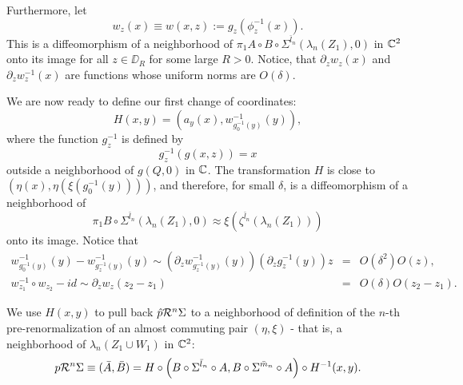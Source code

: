 Furthermore, let
$$w_z(x)\equiv w(x,z) := g_{z}\left(\phi_{z}^{-1}( x) \right).$$
This is a diffeomorphism of a neighborhood of   $\pi_1 A \circ B \circ \Sigma^{\bar l_n}(\lambda_n (Z_1),0)$ in ${\Bbb C}^2$ onto its image for all $z \in \DD_R$ for some large $R>0$.  Notice, that $\partial_z  w_z(x)$ and $\partial_z w^{-1}_z(x)$ are functions whose uniform norms are $O(\delta)$.

We are now ready to define our first change of coordinates:
$$H(x,y) =  (a_y(x),w_{g_0^{-1}(y)}^{-1}(y)),$$
where the function $g^{-1}_z$ is defined by 
\begin{equation}\label{g_inv}
g_z^{-1}(g(x,z))=x
\end{equation}
outside a neighborhood of $g(Q,0)$ in  ${\Bbb C}$. The transformation $H$ is close to $\left(\eta(x),\eta(\xi(g_0^{-1}(y))) \right)$, and therefore, for small $\delta$,  is a diffeomorphism of a neighborhood of $$\pi_1  B \circ \Sigma^{\bar l_n}(\lambda_n (Z_1),0) \approx \xi(\zeta^{\bar l_n}(\lambda_n (Z_1)))$$ onto its image. Notice that
\begin{eqnarray}
\label{correction} w_{g_0^{-1}(y)}^{-1}(y)-w_{g_z^{-1}(y)}^{-1}(y) \sim \left( \partial_z w_{g_z^{-1}(y)}^{-1}(y)  \right) \left(\partial_z g_z^{-1}(y)  \right) z&=&O(\delta^2) O(z),\\
\label{comp} w_{z_1}^{-1} \circ w_{z_2} -id \sim \partial_z w_z (z_2-z_1)&=&O(\delta) O(z_2-z_1).
\end{eqnarray}


 We use $H(x,y)$ to pull back $\hat p \mathcal{R}^n\Sigma$ to a neighborhood of definition of the $n$-th pre-renormalization of an almost commuting pair $(\eta,\xi)$ - that is, a neighborhood of  $\lambda_n (Z_1 \cup W_1)$ in ${\Bbb C}^2$:
$$p \mathcal{R}^n\Sigma\equiv(\bar A, \bar B) = H \circ \left( B \circ \Sigma^{\bar l_n} \circ A, B \circ \Sigma^{\bar m_n} \circ  A \right) \circ H^{-1}(x,y).$$

